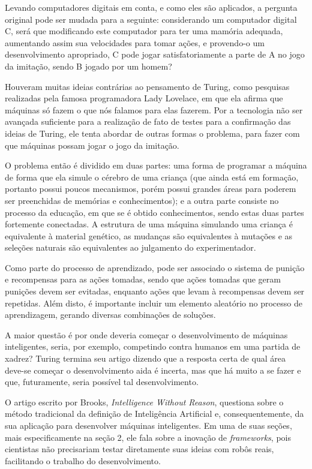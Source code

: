 \documentclass[a4paper,11pt]{article}
\begin{document}
Levando computadores digitais em conta, e como eles são aplicados, a pergunta original pode ser mudada para a seguinte: considerando um computador digital C, será que modificando este computador para ter uma mamória adequada, aumentando assim sua velocidades para tomar ações, e provendo-o um desenvolvimento apropriado, C pode jogar satisfatoriamente a parte de A no jogo da imitação, sendo B jogado por um homem?

Houveram muitas ideias contrárias ao pensamento de Turing, como pesquisas realizadas pela famosa programadora Lady Lovelace, em que ela afirma que máquinas só fazem o que nós falamos para elas fazerem. Por a tecnologia não ser avançada suficiente para a realização de fato de testes para a confirmação das ideias de Turing, ele tenta abordar de outras formas o problema, para fazer com que máquinas possam jogar o jogo da imitação.

O problema então é dividido em duas partes: uma forma de programar a máquina de forma que ela simule o cérebro de uma criança (que ainda está em formação, portanto possui poucos mecanismos, porém possui grandes áreas para poderem ser preenchidas de memórias e conhecimentos); e a outra parte consiste no processo da educação, em que se é obtido conhecimentos, sendo estas duas partes fortemente conectadas. A estrutura de uma máquina simulando uma criança é equivalente à material genético, as mudanças são equivalentes à mutações e as seleções naturais são equivalentes ao julgamento do experimentador.	

Como parte do processo de aprendizado, pode ser associado o sistema de punição e recompensas para as ações tomadas, sendo que ações tomadas que geram punições devem ser evitadas, enquanto ações que levam à recompensas devem ser repetidas. Além disto, é importante incluir um elemento aleatório no processo de aprendizagem, gerando diversas combinações de soluções.

A maior questão é por onde deveria começar o desenvolvimento de máquinas inteligentes, seria, por exemplo, competindo contra humanos em uma partida de xadrez? Turing termina seu artigo dizendo que a resposta certa de qual área deve-se começar o desenvolvimento aida é incerta, mas que há muito a se fazer e que, futuramente, seria possível tal desenvolvimento.

O artigo escrito por Brooks, \textit{Intelligence Without Reason}, questiona sobre o método tradicional da definição de Inteligência Artificial e, consequentemente, da sua aplicação para desenvolver máquinas inteligentes. Em uma de suas seções, mais especificamente na seção 2, ele fala sobre a inovação de \textit{frameworks}, pois cientistas não precisariam testar diretamente suas ideias com robôs reais, facilitando o trabalho do desenvolvimento.
\end{document}
